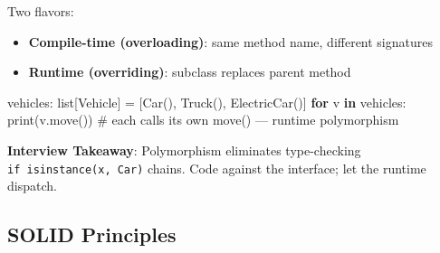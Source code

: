 \documentclass[11pt]{article}
\providecommand{\tightlist}{\setlength{\itemsep}{1pt}\setlength{\parskip}{0pt}}
\newenvironment{Shaded}{\begin{snugshade}}{\end{snugshade}}
\newcommand{\BuiltInTok}[1]{\textcolor[rgb]{0.50,0.55,0.55}{#1}}
\newcommand{\CommentTok}[1]{\textcolor[rgb]{0.48,0.49,0.49}{#1}}
\newcommand{\ControlFlowTok}[1]{\textcolor[rgb]{0.99,0.74,0.29}{\textbf{#1}}}
\newcommand{\KeywordTok}[1]{\textcolor[rgb]{0.81,0.81,0.76}{\textbf{#1}}}
\newcommand{\NormalTok}[1]{\textcolor[rgb]{0.81,0.81,0.76}{#1}}
\newcommand{\OperatorTok}[1]{\textcolor[rgb]{0.81,0.81,0.76}{#1}}
\begin{document}
Two flavors:

\begin{itemize}
\tightlist
\item
  \textbf{Compile-time (overloading)}: same method name, different signatures
\item
  \textbf{Runtime (overriding)}: subclass replaces parent method
\end{itemize}


\begin{Shaded}
\begin{Highlighting}[]
\NormalTok{vehicles: }\BuiltInTok{list}\NormalTok{[Vehicle] }\OperatorTok{=}\NormalTok{ [Car(), Truck(), ElectricCar()]}
\ControlFlowTok{for}\NormalTok{ v }\KeywordTok{in}\NormalTok{ vehicles:}
    \BuiltInTok{print}\NormalTok{(v.move())   }\CommentTok{\# each calls its own move() — runtime polymorphism}
\end{Highlighting}
\end{Shaded}

\textbf{Interview Takeaway}: Polymorphism eliminates type-checking \texttt{if\ isinstance(x,\ Car)} chains. Code against the interface; let the runtime dispatch.

\subsection{SOLID Principles}\label{solid-principles}
\end{document}
